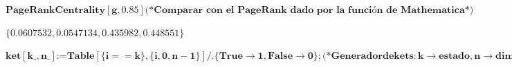 \documentclass{article}
\begin{document}
\begin{doublespace}
\noindent\(\pmb{\text{PageRankCentrality}[g,0.85] \text{(*Comparar con el PageRank dado por la funci{\' o}n de Mathematica*)}}\)
\end{doublespace}

\begin{doublespace}
\noindent\(\{0.0607532,0.0547134,0.435982,0.448551\}\)
\end{doublespace}

\begin{doublespace}
\noindent\(\pmb{\text{ket}[\text{k$\_$},\text{n$\_$}]\text{:=}\text{Table}[\{i==k\},\{i,0,n-1\}]\text{/.}\{\text{True}\to 1,\text{False}\to 0\};
\text{(*}\text{Generador} \text{de} \text{kets}: k \to  \text{estado}, n \to  \text{dimensi{\' o}n}\text{*)}}\)
\end{doublespace}
\end{document}
